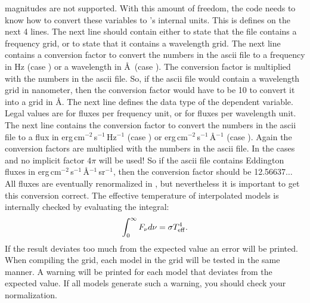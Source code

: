 magnitudes are not supported. With this amount of freedom, the code needs to
know how to convert these variables to \Cloudy's internal units. This is
defines on the next 4 lines. The next line should contain either
 to state that the file contains a frequency grid, or
 to state that it contains a wavelength grid. The next line
contains a conversion factor to convert the numbers in the ascii file to a
frequency in Hz (case ) or a wavelength in \AA\ (case
). The conversion factor is multiplied with the numbers in
the ascii file. So, if the ascii file would contain a wavelength grid in
nanometer, then the conversion factor would have to be 10 to convert it into a
grid in \AA. The next line defines the data type of the dependent variable.
Legal values are  for fluxes per frequency unit, or
 for fluxes per wavelength unit. The next
line contains the conversion factor to convert the numbers in the ascii file
to a flux in erg\,cm$^{-2}$\,s$^{-1}$\,Hz$^{-1}$ (case ) or erg\,cm$^{-2}$\,s$^{-1}$\,\AA$^{-1}$ (case ). Again the conversion factors are multiplied with the numbers in
the ascii file. In the cases  and  no
implicit factor $4\pi$ will be used! So if the ascii file contains Eddington
fluxes  in erg\,cm$^{-2}$\,s$^{-1}$\,\AA$^{-1}$\,sr$^{-1}$,
then the conversion factor should be 12.56637$\ldots$ All fluxes are
eventually renormalized in \Cloudy, but nevertheless it is important to get
this conversion correct. The effective temperature of interpolated models is
internally checked by evaluating the integral:
\[ \int_0^\infty F_\nu d \nu = \sigma T_{\rm eff}^4. \]
If the result deviates too much from the expected value an error will be
printed. When compiling the grid, each model in the grid will be tested in the
same manner. A warning will be printed for each model that deviates from the
expected value. If all models generate such a warning, you should check your
normalization.

